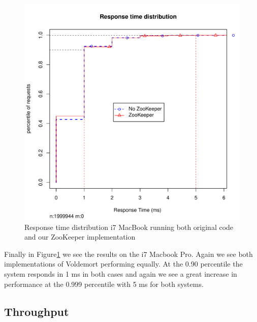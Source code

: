 \begin{figure}[h]
    \centering
    \includegraphics[width=1.0\textwidth]{results/distribution/distribution_eivind}
    \caption{Response time distribution i7 MacBook running both original code and our ZooKeeper implementation}
    \label{fig:dist_eivind}
\end{figure}

Finally in Figure\ref{fig:dist_eivind} we see the results on the i7 Macbook Pro. Again we see both implementations of Voldemort performing equally. At the 0.90 percentile the system responds in 1 ms in both cases and again we see a great increase in performance at the 0.999 percentile with 5 ms for both systems.

\subsection{Throughput}

\clearpage

